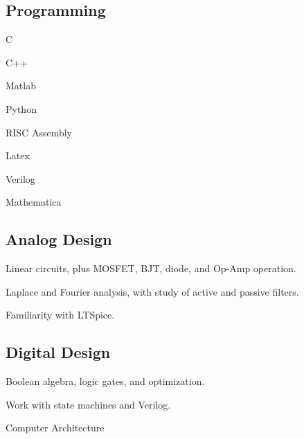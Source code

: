 \documentclass[]{deedy-resume-openfont}
\begin{document}
\begin{minipage}[t]{0.4\textwidth}
\subsection{Programming}
\begin{minipage}[t]{.35\textwidth}
\begin{tightemize}
\item C
\item C++
\item Matlab 
\item Python 
\end{tightemize}
\end{minipage}
\begin{minipage}[t]{.44\textwidth}
\begin{tightemize}
\item RISC Assembly 
\item Latex
\item Verilog 
\item Mathematica
\end{tightemize}
\end{minipage}
\sectionsep

\subsection{Analog Design}
\vspace*{\topsep} %
\begin{tightemize}
\item Linear circuits, plus MOSFET, BJT, diode, and Op-Amp operation.
\item Laplace and Fourier analysis, with study of active and passive filters.
\item Familiarity with LTSpice.
\end{tightemize}
\sectionsep

\subsection{Digital Design}

\vspace*{\topsep} %
\begin{tightemize}
\item Boolean algebra, logic gates, and optimization.
\item Work with state machines and Verilog.
\item Computer Architecture


\end{tightemize}
\end{minipage}
\end{document}
